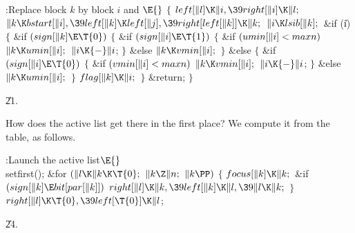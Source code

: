 \B{}:Replace block $k$ by block $i$ and \X${}\E{}$\6
${}\{{}$\1\6
${}\\{left}[\|l]\K\|i,\39\\{right}[\|i]\K\|l;{}$\6
${}\|k\K\\{bstart}[\|i],\39\\{left}[\|k]\K\\{left}[\|j],\39\\{right}[\\{left}[%
\|k]]\K\|k;{}$\6
${}\|i\K\\{lsib}[\|k];{}$\6
\&{if} (\|i)\5
${}\{{}$\1\6
\&{if} ${}(\\{sign}[\|k]\E\T{0}){}$\5
${}\{{}$\1\6
\&{if} ${}(\\{sign}[\|i]\E\T{1}){}$\5
${}\{{}$\1\6
\&{if} ${}(\\{umin}[\|i]<\\{maxn}){}$\1\5
${}\|k\K\\{umin}[\|i];{}$\2\6
${}\|i\K{-}\|i{}$;\6
\4${}\}{}$\5
\2\&{else}\1\5
${}\|k\K\\{vmin}[\|i];{}$\2\6
\4${}\}{}$\5
\2\&{else}\5
${}\{{}$\1\6
\&{if} ${}(\\{sign}[\|i]\E\T{0}){}$\5
${}\{{}$\1\6
\&{if} ${}(\\{vmin}[\|i]<\\{maxn}){}$\1\5
${}\|k\K\\{vmin}[\|i];{}$\2\6
${}\|i\K{-}\|i{}$;\6
\4${}\}{}$\5
\2\&{else}\1\5
${}\|k\K\\{umin}[\|i];{}$\2\6
\4${}\}{}$\2\6
${}\\{flag}[\|k]\K\|i;{}$\6
\4${}\}{}$\2\6
\&{return};\6
\4${}\}{}$\2\par
\U21.\fi

How does the active list get there in the first place? We
compute it from the  table, as follows.

\Y\B\4:Launch the active list\X${}\E{}$\6
\\{setfirst}();\6
\&{for} ${}(\|l\K\|k\K\T{0};{}$ ${}\|k\Z\|n;{}$ ${}\|k\PP){}$\5
${}\{{}$\1\6
${}\\{focus}[\|k]\K\|k;{}$\6
\&{if} ${}(\\{sign}[\|k]\E\\{bit}[\\{par}[\|k]]){}$\1\5
${}\\{right}[\|l]\K\|k,\39\\{left}[\|k]\K\|l,\39\|l\K\|k;{}$\2\6
\4${}\}{}$\2\6
${}\\{right}[\|l]\K\T{0},\39\\{left}[\T{0}]\K\|l{}$;\par
\U24.\fi

